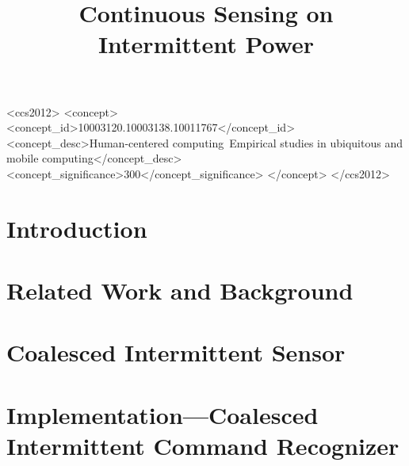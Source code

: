\documentclass[sigconf, anonymous]{acmart}
\begin{document}
\title{Continuous Sensing on Intermittent Power} 


\renewcommand{\shortauthors}{A. Majid et al.}


\begin{abstract}

\end{abstract}

\begin{CCSXML}
<ccs2012>
<concept>
<concept_id>10003120.10003138.10011767</concept_id>
<concept_desc>Human-centered computing~Empirical studies in ubiquitous and mobile computing</concept_desc>
<concept_significance>300</concept_significance>
</concept>
</ccs2012>
\end{CCSXML}


\maketitle


\section{Introduction}
\label{sec:introduction}


\section{Related Work and Background}
\label{sec:relatedwork}

%

\section{Coalesced Intermittent Sensor}
\label{sec:coalInterSen}


\section{Implementation---Coalesced Intermittent Command Recognizer}
\label{sec:disMic}

\end{document}
